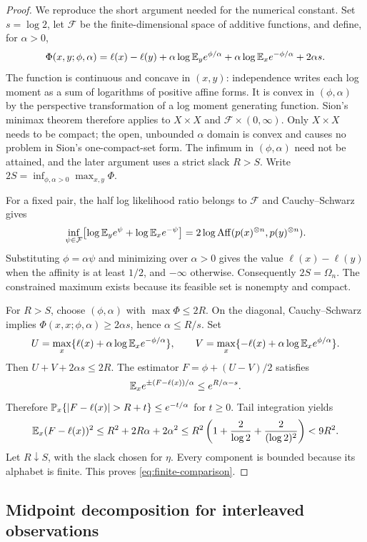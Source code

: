 \begin{proof}
We reproduce the short argument needed for the numerical constant. Set
$s=\log2$, let $\mathcal F$ be the finite-dimensional space of additive
functions, and define, for $\alpha>0$,
\[
 \Phi(x,y;\phi,\alpha)=\ell(x)-\ell(y)
 +\alpha\log\mathbb E_y e^{\phi/\alpha}
 +\alpha\log\mathbb E_x e^{-\phi/\alpha}+2\alpha s.
\]
The function is continuous and concave in $(x,y)$: independence writes each
log moment as a sum of logarithms of positive affine forms. It is convex in
$(\phi,\alpha)$ by the perspective transformation of a log moment generating
function. Sion's minimax theorem \cite[corollary following Theorem 3.4, p.~174]{sion} therefore applies to $X\times X$ and
$\mathcal F\times(0,\infty)$. Only $X\times X$ needs to be compact;
the open, unbounded $\alpha$ domain is convex and causes no problem in
Sion's one-compact-set form. The infimum in $(\phi,\alpha)$ need not be
attained, and the later argument uses a strict slack $R>S$. Write
$2S=\inf_{\phi,\alpha>0}\max_{x,y}\Phi$.

For a fixed pair, the half log likelihood ratio belongs to $\mathcal F$ and
Cauchy--Schwarz gives
\[
 \inf_{\psi\in\mathcal F}
 \bigl[\log\mathbb E_y e^\psi+\log\mathbb E_x e^{-\psi}\bigr]
 =2\log\operatorname{Aff}(p(x)^{\otimes n},p(y)^{\otimes n}).
\]
Substituting $\phi=\alpha\psi$ and minimizing over $\alpha>0$ gives the value
$\ell(x)-\ell(y)$ when the affinity is at least $1/2$, and $-\infty$ otherwise.
Consequently $2S=\Omega_n$. The constrained maximum exists because its feasible
set is nonempty and compact.

For $R>S$, choose $(\phi,\alpha)$ with $\max\Phi\le2R$. On the diagonal,
Cauchy--Schwarz implies $\Phi(x,x;\phi,\alpha)\ge2\alpha s$, hence
$\alpha\le R/s$. Set
\[
 U=\max_x\{\ell(x)+\alpha\log\mathbb E_xe^{-\phi/\alpha}\},\qquad
 V=\max_x\{-\ell(x)+\alpha\log\mathbb E_xe^{\phi/\alpha}\}.
\]
Then $U+V+2\alpha s\le2R$. The estimator
$F=\phi+(U-V)/2$ satisfies
\[
 \mathbb E_xe^{\pm(F-\ell(x))/\alpha}\le e^{R/\alpha-s}.
\]
Therefore $\Pp_x\{|F-\ell(x)|>R+t\}\le e^{-t/\alpha}$ for $t\ge0$.
Tail integration yields
\[
 \mathbb E_x(F-\ell(x))^2
 \le R^2+2R\alpha+2\alpha^2
 \le R^2\left(1+\frac2{\log2}+\frac2{(\log2)^2}\right)<9R^2.
\]
Let $R\downarrow S$, with the slack chosen for $\eta$. Every component is
bounded because its alphabet is finite. This proves
\eqref{eq:finite-comparison}.
\end{proof}


\subsection{Midpoint decomposition for interleaved observations}

